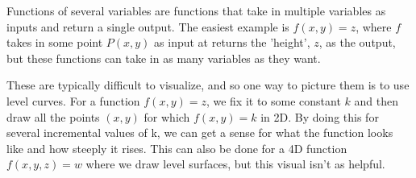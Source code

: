 Functions of several variables are functions that take in multiple variables as inputs and return a single output. The easiest example is $f(x, y) = z$, where $f$ takes in some point $P(x, y)$ as input at returns the 'height', $z$, as the output, but these functions can take in as many variables as they want.

These are typically difficult to visualize, and so one way to picture them is to use level curves. For a function $f(x, y) = z$, we fix it to some constant $k$ and then draw all the points $(x, y)$ for which $f(x, y) = k$ in 2D. By doing this for several incremental values of k, we can get a sense for what the function looks like and how steeply it rises. This can also be done for a 4D function $f(x, y, z) = w$ where we draw level surfaces, but this visual isn't as helpful.
